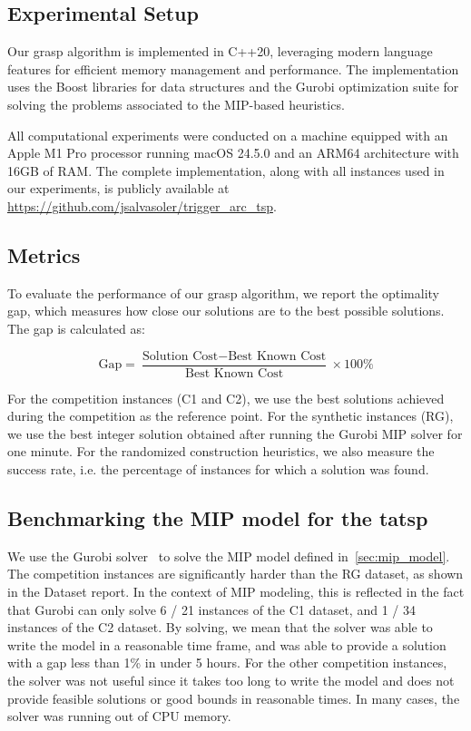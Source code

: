 \subsection{Experimental Setup}

Our \gls{grasp} algorithm is implemented in C++20, leveraging modern language features for efficient memory management and performance. The implementation uses the Boost libraries for data structures and the Gurobi optimization suite for solving the problems associated to the MIP-based heuristics.

All computational experiments were conducted on a machine equipped with an Apple M1 Pro processor running macOS 24.5.0 and an ARM64 architecture with 16GB of RAM.
The complete implementation, along with all instances used in our experiments, is publicly available at \url{https://github.com/jsalvasoler/trigger_arc_tsp}.

\subsection{Metrics}

To evaluate the performance of our \gls{grasp} algorithm, we report the optimality gap, which measures how close our solutions are to the best possible solutions. The gap is calculated as:

\begin{equation}
\text{Gap} = \frac{\text{Solution Cost} - \text{Best Known Cost}}{\text{Best Known Cost}} \times 100\%
\end{equation}

For the competition instances (C1 and C2), we use the best solutions achieved during the competition as the reference point.
For the synthetic instances (RG), we use the best integer solution obtained after running the Gurobi MIP solver for one minute.
For the randomized construction heuristics, we also measure the success rate, i.e. the percentage of instances for which a solution was found.

\subsection{Benchmarking the MIP model for the \gls{tatsp}}

We use the Gurobi solver~\cite{gurobi} to solve the MIP model defined in~\ref{sec:mip_model}.
The competition instances are significantly harder than the RG dataset, as shown in the Dataset report. In the context of MIP modeling, this is reflected in the fact
that Gurobi can only solve 6 / 21 instances of the C1 dataset, and 1 / 34 instances of the C2 dataset.
By solving, we mean that the solver was able to write the model in a reasonable time frame, and was able to provide a solution with a gap less than 1\% in under 5 hours.
For the other competition instances, the solver was not useful since it takes too long to write the model and does not provide feasible solutions or good bounds in reasonable times.
In many cases, the solver was running out of CPU memory.

